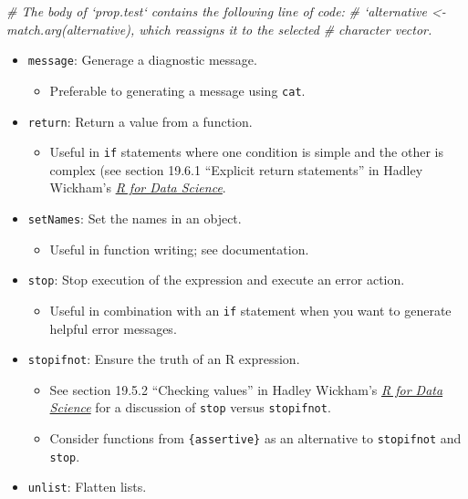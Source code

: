 \documentclass[
]{book}
\newenvironment{Shaded}{\begin{snugshade}}{\end{snugshade}}
\newcommand{\CommentTok}[1]{\textcolor[rgb]{0.56,0.35,0.01}{\textit{#1}}}
\providecommand{\tightlist}{%
  \setlength{\itemsep}{0pt}\setlength{\parskip}{0pt}}
\begin{document}
\begin{Shaded}
\begin{Highlighting}[]
\CommentTok{# The body of `prop.test` contains the following line of code:}
\CommentTok{# `alternative <- match.arg(alternative), which reassigns it to the selected}
\CommentTok{# character vector.}
\end{Highlighting}
\end{Shaded}

\begin{itemize}
\tightlist
\item
  \texttt{message}: Generage a diagnostic message.

  \begin{itemize}
  \tightlist
  \item
    Preferable to generating a message using \texttt{cat}.
  \end{itemize}
\item
  \texttt{return}: Return a value from a function.

  \begin{itemize}
  \tightlist
  \item
    Useful in \texttt{if} statements where one condition is simple and the other is complex (see section 19.6.1 ``Explicit return statements'' in Hadley Wickham's \href{https://r4ds.had.co.nz/functions.html}{\emph{R for Data Science}}.
  \end{itemize}
\item
  \texttt{setNames}: Set the names in an object.

  \begin{itemize}
  \tightlist
  \item
    Useful in function writing; see documentation.
  \end{itemize}
\item
  \texttt{stop}: Stop execution of the expression and execute an error action.

  \begin{itemize}
  \tightlist
  \item
    Useful in combination with an \texttt{if} statement when you want to generate helpful error messages.
  \end{itemize}
\item
  \texttt{stopifnot}: Ensure the truth of an R expression.

  \begin{itemize}
  \tightlist
  \item
    See section 19.5.2 ``Checking values'' in Hadley Wickham's \href{https://r4ds.had.co.nz/functions.html}{\emph{R for Data Science}} for a discussion of \texttt{stop} versus \texttt{stopifnot}.
  \item
    Consider functions from \texttt{\{assertive\}} as an alternative to \texttt{stopifnot} and \texttt{stop}.
  \end{itemize}
\item
  \texttt{unlist}: Flatten lists.


\end{itemize}
\end{document}

